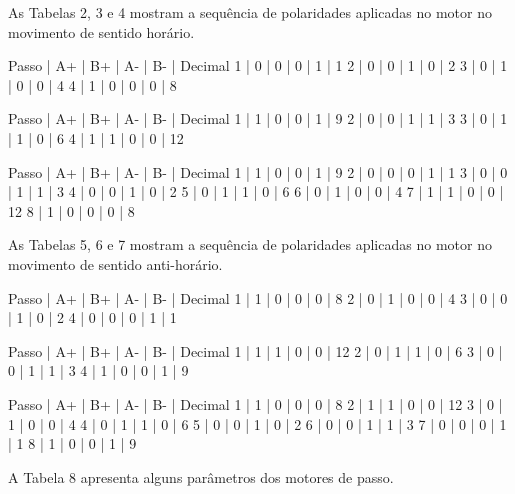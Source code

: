 As Tabelas 2, 3 e 4 mostram a sequência de polaridades aplicadas no motor no movimento de sentido horário.


Passo | A+ | B+ | A- | B- | Decimal
1 | 0 | 0 | 0 | 1 | 1
2 | 0 | 0 | 1 | 0 | 2
3 | 0 | 1 | 0 | 0 | 4
4 | 1 | 0 | 0 | 0 | 8


Passo | A+ | B+ | A- | B- | Decimal
1 | 1 | 0 | 0 | 1 | 9
2 | 0 | 0 | 1 | 1 | 3
3 | 0 | 1 | 1 | 0 | 6
4 | 1 | 1 | 0 | 0 | 12


Passo | A+ | B+ | A- | B- | Decimal
1 | 1 | 0 | 0 | 1 | 9
2 | 0 | 0 | 0 | 1 | 1
3 | 0 | 0 | 1 | 1 | 3
4 | 0 | 0 | 1 | 0 | 2
5 | 0 | 1 | 1 | 0 | 6
6 | 0 | 1 | 0 | 0 | 4
7 | 1 | 1 | 0 | 0 | 12
8 | 1 | 0 | 0 | 0 | 8

As Tabelas 5, 6 e 7 mostram a sequência de polaridades aplicadas no motor no movimento de sentido anti-horário.


Passo | A+ | B+ | A- | B- | Decimal
1 | 1 | 0 | 0 | 0 | 8
2 | 0 | 1 | 0 | 0 | 4
3 | 0 | 0 | 1 | 0 | 2
4 | 0 | 0 | 0 | 1 | 1


Passo | A+ | B+ | A- | B- | Decimal
1 | 1 | 1 | 0 | 0 | 12
2 | 0 | 1 | 1 | 0 | 6
3 | 0 | 0 | 1 | 1 | 3
4 | 1 | 0 | 0 | 1 | 9


Passo | A+ | B+ | A- | B- | Decimal
1 | 1 | 0 | 0 | 0 | 8
2 | 1 | 1 | 0 | 0 | 12
3 | 0 | 1 | 0 | 0 | 4
4 | 0 | 1 | 1 | 0 | 6
5 | 0 | 0 | 1 | 0 | 2
6 | 0 | 0 | 1 | 1 | 3
7 | 0 | 0 | 0 | 1 | 1
8 | 1 | 0 | 0 | 1 | 9

A Tabela 8 apresenta alguns parâmetros dos motores de passo.


